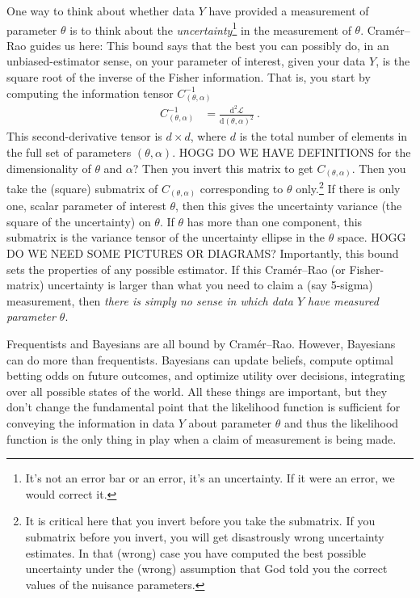 \documentclass{article}
\newcommand{\dd}{\mathrm{d}}
\begin{document}
One way to think about whether data $Y$ have provided a measurement of parameter $\theta$ is to think about the \emph{uncertainty}\footnote{%
It's not an error bar or an error, it's an uncertainty. If it were an error, we would correct it.}
in the measurement of $\theta$.
Cram\'er--Rao guides us here:
This bound says that the best you can possibly do, in an unbiased-estimator sense, on your parameter of interest, given your data $Y$, is the square root of the inverse of the Fisher information.
That is, you start by computing the information tensor $C^{-1}_{(\theta,\alpha)}$
\begin{align}
    C^{-1}_{(\theta,\alpha)} &= \frac{\dd^2\mathscr{L}}{\dd(\theta,\alpha)^2} ~.
\end{align}
This second-derivative tensor is $d\times d$, where $d$ is the total number of elements in the full set of parameters $(\theta,\alpha)$.
HOGG DO WE HAVE DEFINITIONS for the dimensionality of $\theta$ and $\alpha$?
Then you invert this matrix to get $C_{(\theta,\alpha)}$.
Then you take the (square) submatrix of $C_{(\theta,\alpha)}$ corresponding to $\theta$ only.\footnote{It is critical here that you invert before you take the submatrix. If you submatrix before you invert, you will get disastrously wrong uncertainty estimates. In that (wrong) case you have computed the best possible uncertainty under the (wrong) assumption that God told you the correct values of the nuisance parameters.}
If there is only one, scalar parameter of interest $\theta$, then this gives the uncertainty variance (the square of the uncertainty) on $\theta$.
If $\theta$ has more than one component, this submatrix is the variance tensor of the uncertainty ellipse in the $\theta$ space.
HOGG DO WE NEED SOME PICTURES OR DIAGRAMS?
Importantly, this bound sets the properties of any possible estimator.
If this Cram\'er--Rao (or Fisher-matrix) uncertainty is larger than what you need to claim a (say 5-sigma) measurement, then \emph{there is simply no sense in which data $Y$ have measured parameter $\theta$}.

Frequentists and Bayesians are all bound by Cram\'er--Rao.
However, Bayesians can do more than frequentists.
Bayesians can update beliefs, compute optimal betting odds on future outcomes, and optimize utility over decisions, integrating over all possible states of the world.
All these things are important, but they don't change the fundamental point that the likelihood function is sufficient for conveying the information in data $Y$ about parameter $\theta$ and thus the likelihood function is the only thing in play when a claim of measurement is being made.
\end{document}
